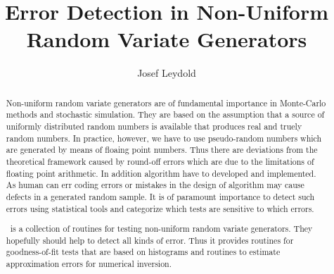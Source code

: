 
\subject{\Huge\rvgtest}

\title{Error Detection in Non-Uniform Random Variate Generators}
\author{Josef Leydold}
\publishers{%
  Institute for Statistics and Mathematics, WU Vienna, Austria}


\maketitle


\begin{abstract}
  \noindent
  Non-uniform random variate generators are of fundamental importance
  in Monte-Carlo methods and stochastic simulation. They are based on
  the assumption that a source of uniformly distributed random numbers
  is available that produces real and truely random numbers.
  In practice, however, we have to use pseudo-random numbers which are
  generated by means of floaing point numbers.
  Thus there are deviations from the theoretical framework caused by 
  round-off errors which are due to the limitations of floating point
  arithmetic. In addition algorithm have to developed and
  implemented. As human can err coding errors or mistakes in the
  design of algorithm may cause defects in a generated random sample.
  It is of paramount importance to detect such errors using
  statistical tools and categorize which tests are sensitive to which
  errors. 

  \rvgtest\ is a collection of routines for testing non-uniform random
  variate generators. They hopefully should help to detect all kinds
  of error. Thus it provides routines for goodness-of-fit tests that
  are based on histograms and routines to estimate approximation
  errors for numerical inversion.
\end{abstract}


\noindent 

